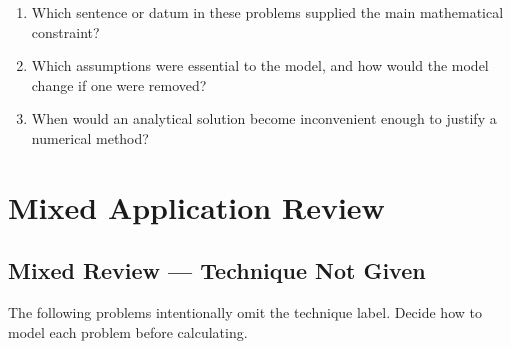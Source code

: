 \documentclass[11pt]{book}
\begin{document}
\begin{reflectionbox}\begin{enumerate}
\item Which sentence or datum in these problems supplied the main mathematical constraint?
\item Which assumptions were essential to the model, and how would the model change if one were removed?
\item When would an analytical solution become inconvenient enough to justify a numerical method?
\end{enumerate}\end{reflectionbox}
\part{Mixed Application Review}
\chapter{Mixed Review — Technique Not Given}
The following problems intentionally omit the technique label. Decide how to model each problem before calculating.
\end{document}
